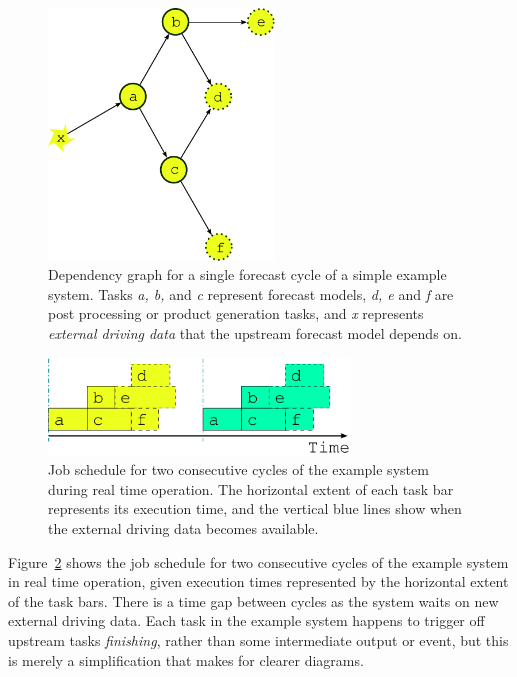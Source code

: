 \documentclass[11pt,a4paper]{article}
\begin{document}
\begin{figure} 
    \begin{center}
        \includegraphics[width=6cm]{inkscape-svg/dep-one-cycle} 
    \end{center}
    \caption{\small Dependency graph for a single forecast cycle of a
    simple example system. Tasks {\em a, b,} and {\em c} represent
    forecast models, {\em d, e} and {\em f} are post processing or
    product generation tasks, and {\em x} represents {\em external
    driving data} that the upstream forecast model depends on.}
    \label{fig-dep-one} 
\end{figure} 

\begin{figure}
    \begin{center}
        \includegraphics[width=8cm]{inkscape-svg/timeline-one}
    \end{center}
    \caption{\small Job schedule for two consecutive cycles of
the example system during real time operation. The horizontal extent of
each task bar represents its execution time, and the vertical blue lines
show when the external driving data becomes available.}
    \label{fig-time-one}
\end{figure}

Figure~\ref{fig-time-one} shows the job schedule for two consecutive
cycles of the example system in real time operation, given execution
times represented by the horizontal extent of the task bars. There is a
time gap between cycles as the system waits on new external driving
data.  Each task in the example system happens to trigger off upstream
tasks {\em finishing}, rather than some intermediate output or event,
but this is merely a simplification that makes for clearer diagrams.
\end{document}
